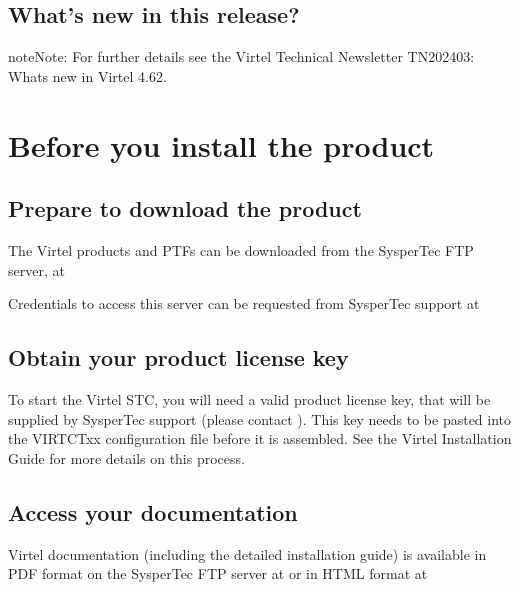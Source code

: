 \documentclass[letterpaper,10pt,english]{sphinxmanual}
\begin{document}
\section{What’s new in this release?}
\label{\detokenize{Getting_Started:what-s-new-in-this-release}}
\begin{sphinxadmonition}{note}{Note:}
\sphinxAtStartPar
For further details see the Virtel Technical Newsletter TN202403: Whats new in Virtel 4.62.
\end{sphinxadmonition}


\chapter{Before you install the product}
\label{\detokenize{Getting_Started:before-you-install-the-product}}

\section{Prepare to download the product}
\label{\detokenize{Getting_Started:prepare-to-download-the-product}}
\sphinxAtStartPar
The Virtel products and PTFs can be downloaded from the SysperTec FTP server, at 

\sphinxAtStartPar
Credentials to access this server can be requested from SysperTec support at 


\section{Obtain your product license key}
\label{\detokenize{Getting_Started:obtain-your-product-license-key}}
\sphinxAtStartPar
To start the Virtel STC, you will need a valid product license key, that will be supplied by SysperTec support (please contact ). This key needs to be pasted into the VIRTCTxx configuration file before it is assembled. See the Virtel Installation Guide for more details on this process.


\section{Access your documentation}
\label{\detokenize{Getting_Started:access-your-documentation}}
\sphinxAtStartPar
Virtel documentation (including the detailed installation guide) is available in PDF format on the SysperTec FTP server at  or in HTML format at 
\end{document}
